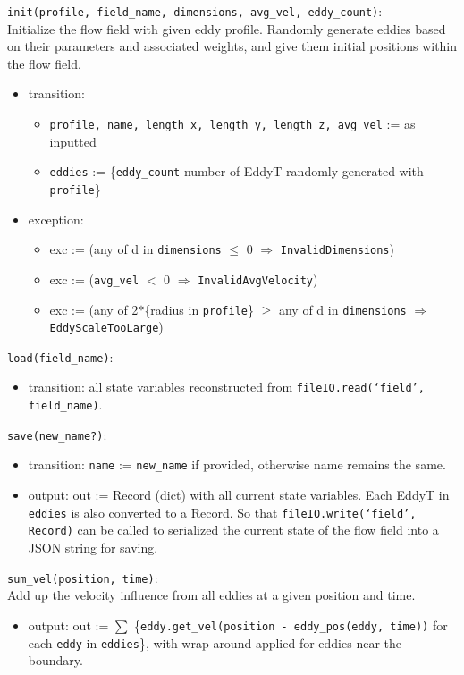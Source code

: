 \documentclass[12pt, titlepage]{article}
\begin{document}
\noindent \texttt{init(profile, field\_name, dimensions, avg\_vel, eddy\_count)}:\\
Initialize the flow field with given eddy profile. Randomly generate eddies based on their parameters and associated weights, and give them initial positions within the flow field.
\begin{itemize}
\item transition: 
  \begin{itemize}
    \item \texttt{profile, name, length\_x, length\_y, length\_z, avg\_vel} := as inputted
    \item \texttt{eddies} := \{\texttt{eddy\_count} number of EddyT randomly generated with \texttt{profile}\}
  \end{itemize}
\item exception: 
  \begin{itemize}
    \item exc := (any of d in \texttt{dimensions} $\le$ 0 $\Rightarrow$ \texttt{InvalidDimensions})
    \item exc := (\texttt{avg\_vel} $<$ 0 $\Rightarrow$ \texttt{InvalidAvgVelocity})
    \item exc := (any of 2$*$\{radius in \texttt{profile}\} $\ge$ any of d in \texttt{dimensions} $\Rightarrow$ \texttt{EddyScaleTooLarge})
  \end{itemize}
\end{itemize}

\noindent \texttt{load(field\_name)}:
\begin{itemize}
  \item transition: all state variables reconstructed from \texttt{fileIO.read(`field', field\_name)}.
\end{itemize}

\noindent \texttt{save(new\_name?)}:
\begin{itemize}
  \item transition: \texttt{name} := \texttt{new\_name} if provided, otherwise name remains the same.
  \item output: out := Record (dict) with all current state variables. Each EddyT in \texttt{eddies} is also converted to a Record. So that \texttt{fileIO.write(`field', Record)} can be called to serialized the current state of the flow field into a JSON string for saving.
\end{itemize}

\noindent \texttt{sum\_vel(position, time)}:\\
Add up the velocity influence from all eddies at a given position and time.
\begin{itemize}
  \item output: out := $\sum$ \{\texttt{eddy.get\_vel(position - eddy\_pos(eddy, time))} for each \texttt{eddy} in \texttt{eddies}\}, with wrap-around applied for eddies near the boundary.
\end{itemize}
\end{document}
